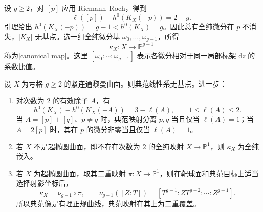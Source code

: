 设 \(g\ge2\)，对 \([p]\) 应用 Riemann--Roch，得到
\[
	\ell([p])-h^0(K_X(-p))=2-g.
\]
引理给出 \(h^0(K_X(-p))=g-1<h^0(K_X)=g\)。因此总有全纯微分在 \(p\) 不消失，\(|K_X|\) 无基点。选一组全纯微分基 \(\omega_0,\ldots,\omega_{g-1}\)，所得
\[
	\kappa_X:X\longrightarrow\mathbb P^{g-1}
\]
称为[canonical map]。这里 \([\omega_0:\cdots:\omega_{g-1}]\) 表示各微分相对于同一局部标架 \(\mathrm{d}z\) 的系数比值。

\begin{theorem}\label{g4:thm:0305:canonical-map}
	设 \(X\) 为亏格 \(g\ge2\) 的紧连通黎曼曲面。则典范线性系无基点。进一步：
	\begin{enumerate}
		\item 对次数为 \(2\) 的有效除子 \(A\)，有
		\begin{equation}\label{g4:eq:0305:canonical-jets}
			h^0(K_X)-h^0(K_X(-A))=3-\ell(A),
			\qquad 1\le\ell(A)\le2.
		\end{equation}
		当 \(A=[p]+[q]\)、\(p\ne q\) 时，典范映射分离 \(p,q\) 当且仅当 \(\ell(A)=1\)；当 \(A=2[p]\) 时，其在 \(p\) 的微分非零当且仅当 \(\ell(A)=1\)。
		\item 若 \(X\) 不是超椭圆曲面，即不存在次数为 \(2\) 的全纯映射 \(X\to\mathbb P^1\)，则 \(\kappa_X\) 为全纯嵌入。
		\item 若 \(X\) 为超椭圆曲面，取其二重映射 \(\pi:X\to\mathbb P^1\)，则在靶球面和典范目标上适当选择射影坐标后，
		\[
			\kappa_X=\nu_{g-1}\circ\pi,\qquad
			\nu_{g-1}([Z:T])
			=[T^{g-1}:ZT^{g-2}:\cdots:Z^{g-1}].
		\]
		所以典范像是有理正规曲线，典范映射在其上为二重覆盖。
	\end{enumerate}
\end{theorem}
